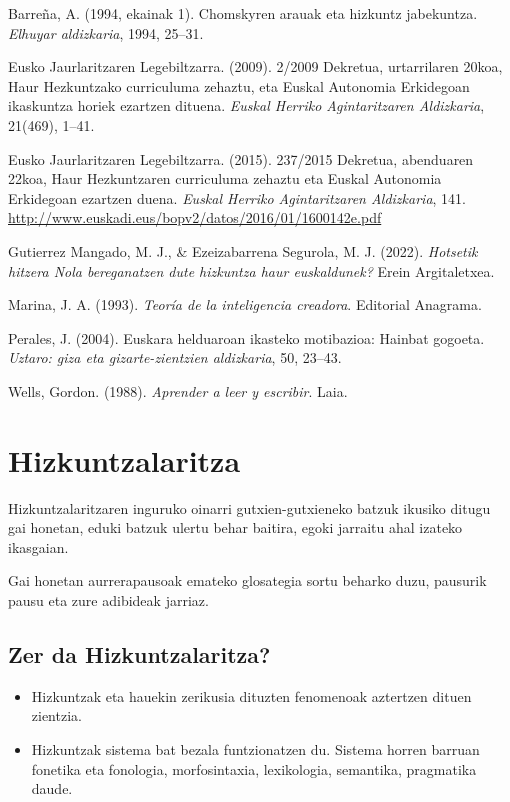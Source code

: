 \documentclass[
]{book}
\providecommand{\tightlist}{%
  \setlength{\itemsep}{0pt}\setlength{\parskip}{0pt}}
\begin{document}
Barreña, A. (1994, ekainak 1). Chomskyren arauak eta hizkuntz jabekuntza. \emph{Elhuyar aldizkaria}, 1994, 25--31.

Eusko Jaurlaritzaren Legebiltzarra. (2009). 2/2009 Dekretua, urtarrilaren 20koa, Haur Hezkuntzako curriculuma zehaztu, eta Euskal Autonomia Erkidegoan ikaskuntza horiek ezartzen dituena. \emph{Euskal Herriko Agintaritzaren Aldizkaria}, 21(469), 1--41.

Eusko Jaurlaritzaren Legebiltzarra. (2015). 237/2015 Dekretua, abenduaren 22koa, Haur Hezkuntzaren curriculuma zehaztu eta Euskal Autonomia Erkidegoan ezartzen duena. \emph{Euskal Herriko Agintaritzaren Aldizkaria}, 141. \url{http://www.euskadi.eus/bopv2/datos/2016/01/1600142e.pdf}

Gutierrez Mangado, M. J., \& Ezeizabarrena Segurola, M. J. (2022). \emph{Hotsetik hitzera Nola bereganatzen dute hizkuntza haur euskaldunek?} Erein Argitaletxea.

Marina, J. A. (1993). \emph{Teoría de la inteligencia creadora}. Editorial Anagrama.

Perales, J. (2004). Euskara helduaroan ikasteko motibazioa: Hainbat gogoeta. \emph{Uztaro: giza eta gizarte-zientzien aldizkaria}, 50, 23--43.

Wells, Gordon. (1988). \emph{Aprender a leer y escribir}. Laia.

\hypertarget{hizkuntzalaritza}{%
\chapter{Hizkuntzalaritza}\label{hizkuntzalaritza}}

Hizkuntzalaritzaren inguruko oinarri gutxien-gutxieneko batzuk ikusiko ditugu gai honetan, eduki batzuk ulertu behar baitira, egoki jarraitu ahal izateko ikasgaian.

Gai honetan aurrerapausoak emateko glosategia sortu beharko duzu, pausurik pausu eta zure adibideak jarriaz.

\hypertarget{zer-da-hizkuntzalaritza}{%
\section{Zer da Hizkuntzalaritza?}\label{zer-da-hizkuntzalaritza}}

\begin{itemize}
\tightlist
\item
  Hizkuntzak eta hauekin zerikusia dituzten fenomenoak aztertzen
  dituen zientzia.
\item
  Hizkuntzak sistema bat bezala funtzionatzen du. Sistema horren
  barruan fonetika eta fonologia, morfosintaxia, lexikologia,
  semantika, pragmatika daude.
\end{itemize}
\end{document}
